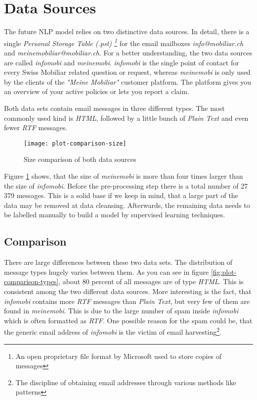 \section{Data Sources}
\label{chap:data-source}
The future NLP model relies on two distinctive data sources. In detail, there is a single \emph{Personal Storage Table (.pst)
\footnote{An open proprietary file format by Microsoft used to store copies of messages}} for the email mailboxes
\emph{info@mobiliar.ch} and \emph{meinemobiliar@mobiliar.ch}. For a better understanding, the two data sources are called
\emph{\gls{infomobi}} and \emph{\gls{meinemobi}}. \emph{infomobi} is the single point of contact for every Swiss Mobiliar
related question or request, whereas \emph{meinemobi} is only used by the clients of the \emph{"Meine Mobiliar"} customer platform.
The platform gives you an overview of your active policies or lets you report a claim.

Both data sets contain email messages in three different types. The most commonly used kind is \emph{HTML}, followed by
a little bunch of \emph{Plain Text} and even fewer \emph{RTF} messages.

\begin{figure}[!ht]
    \centering
    \texttt{[image: plot-comparison-size]}
    \caption{Size comparison of both data sources}
    \label{fig:plot-comparison-size}
\end{figure}

Figure \ref{fig:plot-comparison-size} shows, that the size of \emph{meinemobi} is more than four times larger than the size
of \emph{infomobi}. Before the pre-processing step there is a total number of 27 379 messages. This is a solid base if we
keep in mind, that a large part of the data may be removed at data cleansing. Afterwards, the remaining data needs to be
labelled manually to build a model by supervised learning techniques.

\subsection{Comparison}

There are large differences between these two data sets. The distribution of message types hugely varies between them.
As you can see in figure \ref{fig:plot-comparison-types}, about 80 percent of all messages are of type \emph{HTML}.
This is consistent among the two different data sources. More interesting is the fact, that \emph{infomobi} contains
more \emph{RTF} messages than \emph{Plain Text}, but very few of them are found in \emph{meinemobi}. This is due to
the large number of spam inside \emph{infomobi} which is often formatted as \emph{RTF}. One possible reason for the spam could be,
that the generic email address of \emph{infomobi} is the victim of email harvesting\footnote{The discipline of obtaining email
addresses through various methods like patterns}.

